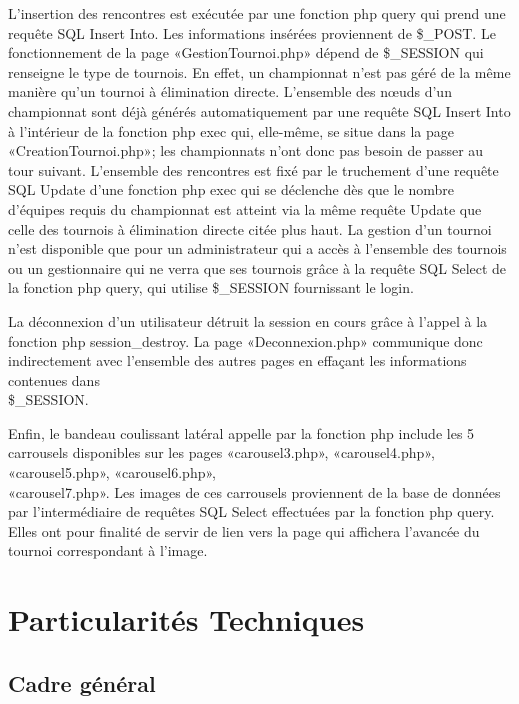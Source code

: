 \documentclass[12pt]{report}
\begin{document}
       L’insertion des rencontres est exécutée par une fonction php query qui prend une requête SQL Insert Into. Les informations insérées proviennent de \$\_POST. 
       Le fonctionnement de la page «GestionTournoi.php» dépend de \$\_SESSION qui renseigne le type de tournois. En effet, un championnat n’est pas géré de la même manière qu’un tournoi à élimination directe. L’ensemble des nœuds d’un championnat sont déjà générés automatiquement par une requête SQL Insert Into à l’intérieur de la fonction php exec qui, elle-même, se situe dans la page «CreationTournoi.php»; les championnats n’ont donc pas besoin de passer au tour suivant. L’ensemble des rencontres est fixé par le truchement d’une requête SQL Update d’une fonction php exec qui se déclenche dès que le nombre d’équipes requis du championnat est atteint via la même requête Update que celle des tournois à élimination directe citée plus haut.   
       La gestion d’un tournoi n’est disponible que pour un administrateur qui a accès à l’ensemble des tournois ou un gestionnaire qui ne verra que ses tournois grâce à la requête SQL Select de la fonction php query, qui utilise \$\_SESSION fournissant le login.
       \bigskip
       \par
	   La déconnexion d’un utilisateur détruit la session en cours grâce à l’appel à la fonction php session\_destroy. La page «Deconnexion.php» communique donc indirectement avec l’ensemble des autres pages en effaçant les informations contenues dans \\ \$\_SESSION.
       \bigskip
       \par
	   Enfin, le bandeau coulissant latéral appelle par la fonction php include les 5 carrousels disponibles sur les pages «carousel3.php», «carousel4.php», «carousel5.php», «carousel6.php»,\\ «carousel7.php».
       Les images de ces carrousels proviennent de la base de données par l’intermédiaire de requêtes SQL Select effectuées par la fonction php query. Elles ont pour finalité de servir de lien vers la page qui affichera l’avancée du tournoi correspondant à l’image.
       
       
        \chapter{Particularités Techniques}
        
        \section{Cadre général}
\end{document}
